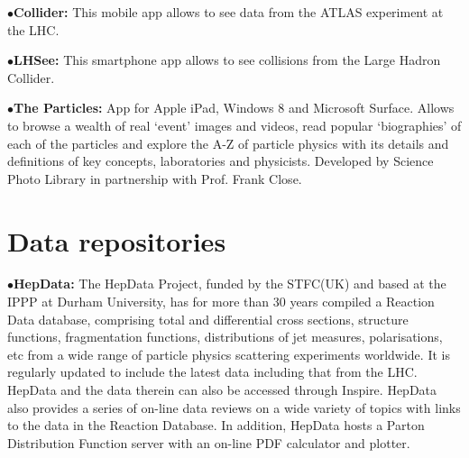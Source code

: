 \medskip

\item{$\bullet$}{\bf Collider:}
This mobile app allows to see data from the ATLAS experiment at the LHC.
	\item{}

\medskip

\item{$\bullet$}{\bf LHSee:}
This smartphone app allows to see collisions from the Large Hadron Collider.
	\item{}

\medskip

\item{$\bullet$}{\bf The Particles:}
App for Apple iPad, Windows 8 and Microsoft Surface. Allows to browse a wealth of real ‘event’ images and videos, read popular ‘biographies’ of each of the particles and explore the A-Z of particle physics with its details and definitions of key concepts, laboratories and physicists. Developed by Science Photo Library in partnership with Prof. Frank Close.
	\item{}

\medskip

\section{Data repositories}  %

\medskip


\medskip


\item{$\bullet$}{\bf HepData:} 
The HepData Project, funded by the STFC(UK) and based at the IPPP at Durham University, has for more than 30 years compiled a Reaction Data database, comprising total and differential cross sections, structure functions, fragmentation functions, distributions of jet measures, polarisations, etc from a wide range of particle physics scattering experiments worldwide. It is regularly updated to include the latest data including that from the LHC. HepData and the data therein can also be accessed through Inspire. HepData also provides a series of on-line data reviews on a wide variety of topics with links to the data in the Reaction Database. In addition, HepData hosts a Parton Distribution Function server with an on-line PDF calculator and plotter.
	\item{}

